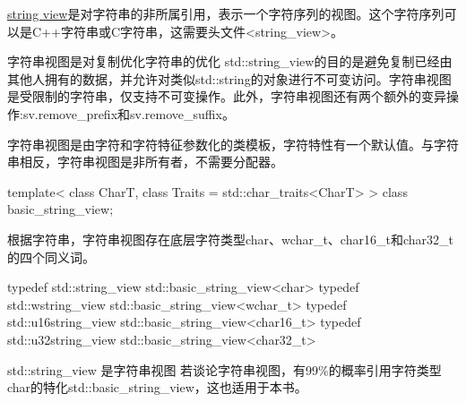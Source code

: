 
\href{http://en.cppreference.com/w/cpp/string/basic_string_view}{string view}是对字符串的非所属引用，表示一个字符序列的视图。这个字符序列可以是C++字符串或C字符串，这需要头文件<string\_view>。

\begin{myTip}{字符串视图是对复制优化字符串的优化}
std::string\_view的目的是避免复制已经由其他人拥有的数据，并允许对类似std::string的对象进行不可变访问。字符串视图是受限制的字符串，仅支持不可变操作。此外，字符串视图还有两个额外的变异操作:sv.remove\_prefix和sv.remove\_suffix。
\end{myTip}

字符串视图是由字符和字符特征参数化的类模板，字符特性有一个默认值。与字符串相反，字符串视图是非所有者，不需要分配器。

\begin{cpp}
template<
	class CharT,
	class Traits = std::char_traits<CharT>
> class basic_string_view;
\end{cpp}

根据字符串，字符串视图存在底层字符类型char、wchar\_t、char16\_t和char32\_t的四个同义词。

\begin{cpp}
typedef std::string_view std::basic_string_view<char>
typedef std::wstring_view std::basic_string_view<wchar_t>
typedef std::u16string_view std::basic_string_view<char16_t>
typedef std::u32string_view std::basic_string_view<char32_t>
\end{cpp}

\begin{myNotic}{std::string\_view 是字符串视图}
若谈论字符串视图，有99\%的概率引用字符类型char的特化std::basic\_string\_view，这也适用于本书。
\end{myNotic}




































